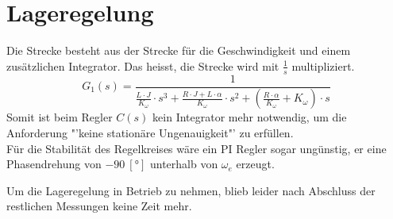 \section{Lageregelung}
Die Strecke besteht aus der Strecke für die Geschwindigkeit und einem 
zusätzlichen Integrator. Das heisst, die Strecke wird mit $\frac{1}{s}$ 
multipliziert. 
\[
    G_1(s) = \frac{1}{ \frac{L \cdot J}{K_\omega} \cdot s^3
        + \frac{R \cdot J + L \cdot \alpha}{K_\omega} \cdot s^2
        + \left(\frac{R \cdot \alpha}{K_\omega} + K_\omega\right) \cdot s
    }
\]
Somit ist beim Regler $C(s)$ kein Integrator mehr notwendig, um die Anforderung 
"'keine stationäre Ungenauigkeit"' zu erfüllen. \\
Für die Stabilität des Regelkreises wäre ein PI Regler sogar ungünstig, er 
eine Phasendrehung von $-90~[\si{\degree}]$ unterhalb von $\omega_e$ erzeugt. 

\noindent Um die Lageregelung in Betrieb zu nehmen, blieb leider nach 
Abschluss der restlichen Messungen keine Zeit mehr. \\
